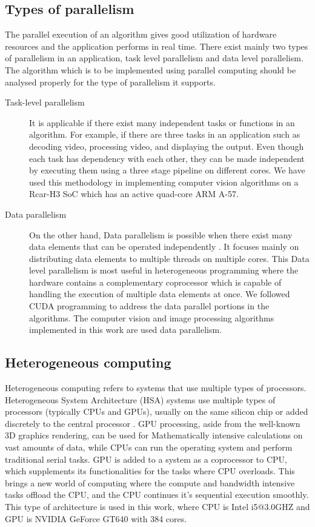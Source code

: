 \subsection{Types of parallelism}
 The parallel execution of an algorithm gives good utilization of hardware resources and the application performs in real time. There exist mainly two types of parallelism in an application, task level parallelism and data level parallelism. The algorithm which is to be implemented using parallel computing should be analysed properly for the type of parallelism it supports.
\begin{description}
\item[Task-level parallelism] \hfill \break It is applicable if there exist many independent tasks or functions in an algorithm. For example, if there are three tasks in an application such as decoding video, processing video, and displaying the output. Even though each task has dependency with each other, they can be made independent by executing them using a three stage pipeline on different cores. We have used this methodology in implementing computer vision algorithms on a Rcar-H3 SoC which has an active quad-core ARM A-57.
\item [Data parallelism] \hfill \break  On the other hand, Data parallelism is possible when there exist many data elements that can be operated independently \cite{alantatourian}. It focuses mainly on distributing data elements to multiple threads on multiple cores. This Data level parallelism is most useful in heterogeneous programming where the hardware contains a complementary coprocessor which is capable of handling the execution of multiple data elements at once. We followed CUDA programming to address the data parallel portions in the algorithms. The computer vision and image processing algorithms implemented in this work are used data parallelism.
\end{description}
\subsection{Heterogeneous computing}
Heterogeneous computing refers to systems that use multiple types of processors. Heterogeneous System Architecture (HSA) systems use multiple types of processors (typically CPUs and GPUs), usually on the same silicon chip or added discretely to the central processor \cite{amd}. GPU processing, aside from the well-known 3D graphics rendering, can be used for Mathematically intensive calculations on vast amounts of data, while CPUs can run the operating system and perform traditional serial tasks. GPU is added to a system as a coprocessor to CPU, which supplements its functionalities for the tasks where CPU overloads. This brings a new world of computing where the compute and bandwidth intensive tasks offload the CPU, and the CPU continues it's sequential execution smoothly. This type of architecture is used in this work, where CPU is Intel i5@3.0GHZ and GPU is NVIDIA GeForce GT640 with 384 cores.
